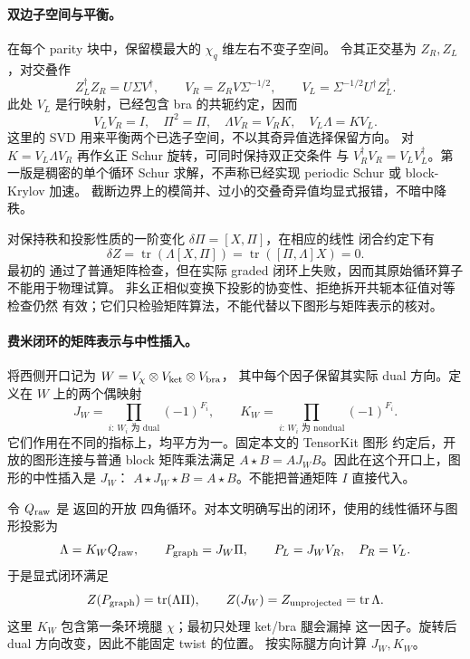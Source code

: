 \paragraph{双边子空间与平衡。}
在每个 parity 块中，保留模最大的 $\chi_q$ 维左右不变子空间。
令其正交基为 $Z_R,Z_L$，对交叠作
\[
 Z_L^\dagger Z_R=U\Sigma V^\dagger,\qquad
 V_R=Z_RV\Sigma^{-1/2},\qquad
 V_L=\Sigma^{-1/2}U^\dagger Z_L^\dagger.
\]
此处 $V_L$ 是行映射，已经包含 bra 的共轭约定，因而
\begin{equation}
 V_LV_R=I,\quad \Pi^2=\Pi,\quad
 \Lambda V_R=V_RK,\quad V_L\Lambda=KV_L.
\end{equation}
这里的 SVD 用来平衡两个已选子空间，不以其奇异值选择保留方向。
对 $K=V_L\Lambda V_R$ 再作幺正 Schur 旋转，可同时保持双正交条件
与 $V_R^\dagger V_R=V_LV_L^\dagger$。第一版是稠密的单个循环
Schur 求解，不声称已经实现 periodic Schur 或 block-Krylov 加速。
截断边界上的模简并、过小的交叠奇异值均显式报错，不暗中降秩。

对保持秩和投影性质的一阶变化 $\delta\Pi=[X,\Pi]$，在相应的线性
闭合约定下有
\[
 \delta Z=\operatorname{tr}(\Lambda[X,\Pi])
          =\operatorname{tr}([\Pi,\Lambda]X)=0.
\]
最初的  通过了普通矩阵检查，但在实际
graded 闭环上失败，因而其原始循环算子不能用于物理试算。
非幺正相似变换下投影的协变性、拒绝拆开共轭本征值对等检查仍然
有效；它们只检验矩阵算法，不能代替以下图形与矩阵表示的核对。

\paragraph{费米闭环的矩阵表示与中性插入。}
将西侧开口记为 $W=V_\chi\otimes V_{\rm ket}\otimes V_{\rm bra}$，
其中每个因子保留其实际 dual 方向。定义在 $W$ 上的两个偶映射
\[
 J_W=\prod_{i:\,W_i\text{ 为 dual}}(-1)^{F_i},\qquad
 K_W=\prod_{i:\,W_i\text{ 为 nondual}}(-1)^{F_i}.
\]
它们作用在不同的指标上，均平方为一。固定本文的 TensorKit 图形
约定后，开放的图形连接与普通 block 矩阵乘法满足
$A\star B=A J_W B$。因此在这个开口上，图形的中性插入是 $J_W$：
$A\star J_W\star B=A\star B$。不能把普通矩阵 $I$ 直接代入。

令 $Q_{\rm raw}$ 是  返回的开放
四角循环。对本文明确写出的闭环，使用的线性循环与图形投影为
\begin{equation}
 \Lambda=K_W Q_{\rm raw},\qquad
 P_{\rm graph}=J_W\Pi,\qquad
 P_L=J_WV_R,\quad P_R=V_L.
\end{equation}
于是显式闭环满足
\[
 Z(P_{\rm graph})=\operatorname{tr}(\Lambda\Pi),\qquad
 Z(J_W)=Z_{\rm unprojected}=\operatorname{tr}\Lambda.
\]
这里 $K_W$ 包含第一条环境腿 $\chi$；最初只处理 ket/bra 腿会漏掉
这一因子。旋转后 dual 方向改变，因此不能固定 twist 的位置。
 按实际腿方向计算 $J_W,K_W$。

